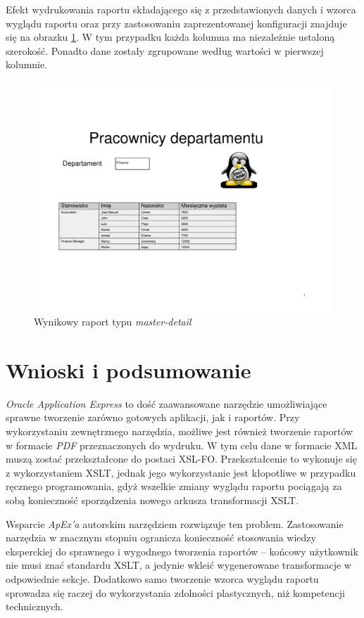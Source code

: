 \documentclass[11pt,a4paper]{article}
\begin{document}
Efekt wydrukowania raportu składającego się z przedstawionych danych i wzorca wyglądu raportu oraz przy zastosowaniu zaprezentowanej konfiguracji znajduje się na obrazku \ref{img:wynikowy}. W tym przypadku każda kolumna ma niezależnie ustaloną szerokość. Ponadto dane zostały zgrupowane według wartości w pierwszej kolumnie.

\begin{figure}[p]
\centering
\includegraphics[scale=0.3,angle=90]{test-md}
\caption{Wynikowy raport typu \emph{master-detail}}
\label{img:wynikowy}
\end{figure}

\newpage

\section{Wnioski i podsumowanie}
\emph{Oracle Application Express} to dość zaawansowane narzędzie umożliwiające sprawne tworzenie zarówno gotowych aplikacji, jak i raportów. Przy wykorzystaniu zewnętrznego narzędzia, możliwe jest również tworzenie raportów w formacie \emph{PDF} przeznaczonych do wydruku. W tym celu dane w formacie XML muszą zostać przekształcone do postaci XSL-FO. Przekształcenie to wykonuje się z wykorzystaniem XSLT, jednak jego wykorzystanie jest kłopotliwe w przypadku ręcznego programowania, gdyż wszelkie zmiany wyglądu raportu pociągają za sobą konieczność sporządzenia nowego arkusza transformacji XSLT.

Wsparcie \emph{ApEx'a} autorskim narzędziem rozwiązuje ten problem. Zastosowanie narzędzia w znacznym stopniu ogranicza konieczność stosowania wiedzy eksperckiej do sprawnego i wygodnego tworzenia raportów -- końcowy użytkownik nie musi znać standardu XSLT, a jedynie wkleić wygenerowane transformacje w odpowiednie sekcje. Dodatkowo samo tworzenie wzorca wyglądu raportu sprowadza się raczej do wykorzystania zdolności plastycznych, niż kompetencji technicznych.
\end{document}
